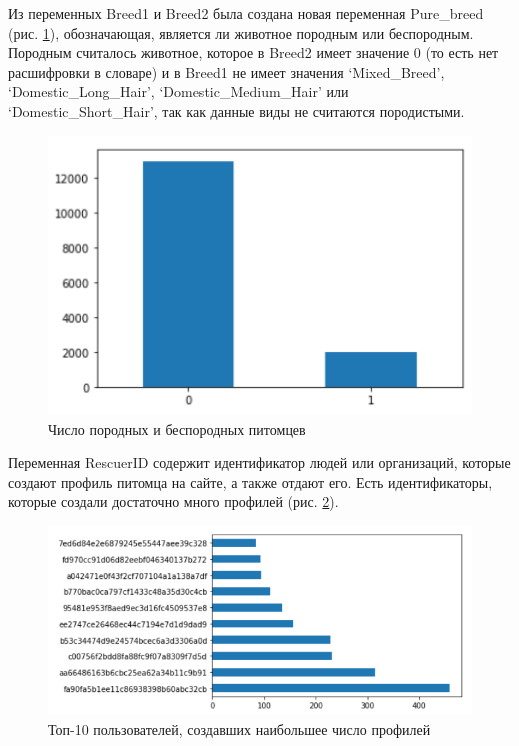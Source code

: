 \documentclass[14pt]{mmcs_article}
\begin{document}
Из переменных Breed1 и Breed2 была создана новая переменная Pure\_breed (рис. \ref{analyse:purebreed}), обозначающая, является ли животное породным или беспородным. Породным считалось животное, которое в Breed2 имеет значение 0 (то есть нет расшифровки в словаре) и в Breed1 не имеет значения `Mixed\_Breed', `Domestic\_Long\_Hair', `Domestic\_Medium\_Hair' или \\ `Domestic\_Short\_Hair', так как данные виды не считаются породистыми.

\begin{figure}[H]
	\centering
	\includegraphics[scale=1]{purebreed.png}
	\caption{Число породных и беспородных питомцев}\label{analyse:purebreed}
\end{figure}

Переменная RescuerID содержит идентификатор людей или организаций, которые создают профиль питомца на сайте, а также отдают его. Есть идентификаторы, которые создали достаточно много профилей (рис. \ref{analyse:toprescuer}). 

\begin{figure}[H]
	\centering
	\includegraphics[scale=1]{toprescuer.png}
	\caption{Топ-10 пользователей, создавших наибольшее число профилей}\label{analyse:toprescuer}
\end{figure}
\end{document}
